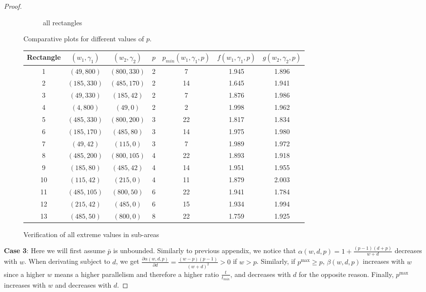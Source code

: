 \documentclass{article}
\begin{document}
\begin{proof}
\begin{figure}[ht]
\begin{subfigure}{0.32\textwidth}
        \caption{all rectangles}
    \end{subfigure}
    \caption{Comparative plots for different values of $p$.}
    \label{fig:all_plotsgen}
\end{figure}

\begin{figure}
\center
\begin{tabular}{|c|c|c|c|c|c|c|}
\hline
Rectangle & $(w_1,\gamma_1)$ & $(w_2,\gamma_2)$ & $p$ & $p_{min}(w_1,\gamma_1,p) $& $f(w_1,\gamma_1,p)$ & $g(w_2,\gamma_2,p)$ \\
\hline
1 & $(49,800)$ & $(800,330)$ & 2 &7 & 1.945 & 1.896 \\
2 & $(185,330)$ & $(485,170)$ & 2 &14 & 1.645 & 1.941 \\
3 & $(49,330)$ & $(185,42)$ & 2 &7 & 1.876 & 1.986 \\
4 & $(4,800)$ & $(49,0)$ & 2 &2 & 1.998 & 1.962 \\
5 & $(485,330)$ & $(800,200)$ & 3 &22 & 1.817 & 1.834 \\
6 & $(185,170)$ & $(485,80)$ & 3 &14 & 1.975 & 1.980 \\
7 & $(49,42)$ & $(115,0)$ & 3 &7 & 1.989 & 1.972 \\
8 & $(485,200)$ & $(800,105)$ & 4 &22 & 1.893 & 1.918 \\
9 & $(185,80)$ & $(485,42)$ & 4 &14 & 1.951 & 1.955 \\
10 & $(115,42)$ & $(215,0)$ & 4 &11 & 1.879 & 2.003 \\
11 & $(485,105)$ & $(800,50)$ & 6 &22 & 1.941 & 1.784 \\
12 & $(215,42)$ & $(485,0)$ & 6 &15 & 1.934 & 1.994 \\
13 & $(485,50)$ & $(800,0)$ & 8 &22 & 1.759 & 1.925 \\
\hline
\end{tabular}
\caption{Verification of all extreme values in sub-areas}
\label{fig.verif2}
\end{figure}
\textbf{Case 3}: Here we will first assume $\bar{p}$ is unbounded. Similarly to previous appendix, we notice that $\alpha(w,d,p)=1+\frac{(p-1)(d+p)}{w+d}$ decreases with $w$. When derivating subject to $d$, we get $\frac{\partial\alpha(w,d,p)}{\partial d}=\frac{(w-p)(p-1)}{(w+d)^2}>0$ if $w>p$. Similarly, if $p^{\max} \geq p$, $\beta(w,d,p)$ increases with $w$ since a higher $w$ means a higher parallelism and therefore a higher ratio $\frac{t}{t_{min}}$, and decreases with $d$ for the opposite reason. Finally, $p^{\max}$ increases with $w$ and decreases with $d$. 


\end{proof}
\end{document}

